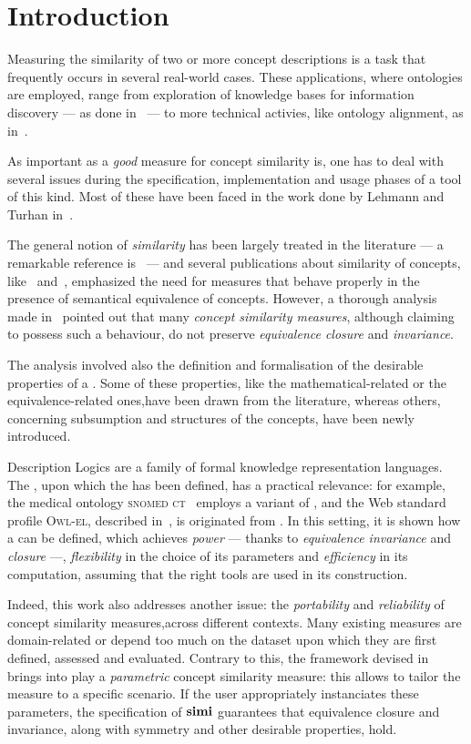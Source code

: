 \section{Introduction}
\label{sec:intro}

Measuring the similarity of two or more concept descriptions is a task that frequently occurs in several real-world cases.
These applications, where ontologies are employed, range from exploration of knowledge bases for information discovery --- as done in~\cite{GF13} --- to more technical activies, like ontology alignment, as in~\cite{CHu11}.

As important as a \emph{good} measure for concept similarity is, one has to deal with several issues during the specification, implementation and usage phases of a tool of this kind.
Most of these have been faced in the work done by Lehmann and Turhan in~\cite{LeTu12}.

The general notion of \emph{similarity} has been largely treated in the literature --- a remarkable reference is~\cite{Tve77} --- and several publications about similarity of concepts, like~\cite{SemSim} and~\cite{dSF08}, emphasized the need for measures that behave properly in the presence of semantical equivalence of concepts.
However, a thorough analysis made in~\cite{LeTu12} pointed out that many \emph{concept similarity measures}, although claiming to possess such a behaviour, do not preserve \emph{equivalence closure} and \emph{invariance}.

The analysis involved also the definition and formalisation of the desirable properties of a \csm.
Some of these properties, like the mathematical-related or the equivalence-related ones,have been drawn from the literature, whereas others, concerning subsumption and structures of the concepts, have been newly introduced.

Description Logics are a family of formal knowledge representation languages.
The \dl \elh, upon which the \csm \simi has been defined, has a practical relevance: for example, the medical ontology \textsc{snomed ct}~\cite{snomed} employs a variant of \elh, and the Web standard profile \textsc{Owl-el}, described in~\cite{owlEL}, is originated from \elh.
In this setting, it is shown how a \csm can be defined, which achieves \emph{power} --- thanks to \emph{equivalence invariance} and \emph{closure} ---, \emph{flexibility} in the choice of its parameters and \emph{efficiency} in its computation, assuming that the right tools are used in its construction.

Indeed, this work also addresses another issue: the \emph{portability} and \emph{reliability} of concept similarity measures,across different contexts.
Many existing measures are domain-related or depend too much on the dataset upon which they are first defined, assessed and evaluated.
Contrary to this, the framework devised in~\cite{LeTu12} brings into play a \emph{parametric} concept similarity measure: this allows to tailor the measure to a specific scenario.
If the user appropriately instanciates these parameters, the specification of \(\mathbf{simi}\) guarantees that equivalence closure and invariance, along with symmetry and other desirable properties, hold.

